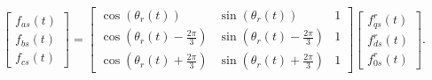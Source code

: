 \documentclass{article}
\begin{document}
\[
\begin{bmatrix}
    f_{as}(t) \\
    f_{bs}(t) \\
    f_{cs}(t)
\end{bmatrix}
=
\begin{bmatrix}
    \cos(\theta_r(t)) & \sin(\theta_r(t)) & 1 \\
    \cos\left(\theta_r(t) - \frac{2\pi}{3}\right) & \sin\left(\theta_r(t) - \frac{2\pi}{3}\right) & 1 \\
    \cos\left(\theta_r(t) + \frac{2\pi}{3}\right) & \sin\left(\theta_r(t) + \frac{2\pi}{3}\right) & 1
\end{bmatrix}
\begin{bmatrix}
    f_{qs}^r(t) \\
    f_{ds}^r(t) \\
    f_{0s}^r(t)
\end{bmatrix}.
\]
\end{document}
